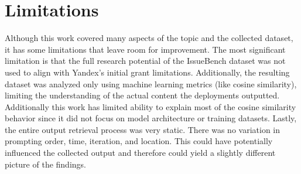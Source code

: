 \section{Limitations}

Although this work covered many aspects of the topic and the collected dataset, it has some limitations that leave room for improvement. The most significant limitation is that the full research potential of the IssueBench dataset was not used to align with Yandex's initial grant limitations. Additionally, the resulting dataset was analyzed only using machine learning metrics (like cosine similarity), limiting the understanding of the actual content the deployments outputted. Additionally this work has limited ability to explain most of the cosine similarity behavior since it did not focus on model architecture or training datasets. Lastly, the entire output retrieval process was very static. There was no variation in prompting order, time, iteration, and location. This could have potentially influenced the collected output and therefore could yield a slightly different picture of the findings.